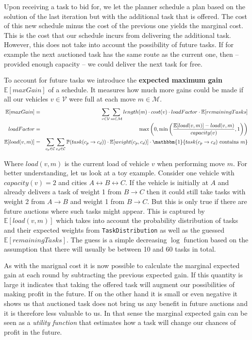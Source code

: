 \documentclass[11pt]{article}
\begin{document}
  Upon receiving a task to bid for, we let the planner schedule a plan based on
  the solution of the last iteration but with the additional task that is offered.
  The cost of this new schedule minus the cost of the previous one yields the
  marginal cost. This is the cost that our schedule incurs from delivering the
  additional task. However, this does not take into account the possibility of
  future tasks. If for example the next auctioned task has the same route as
  the current one, then -- provided enough capacity -- we could deliver the next
  task for free.

  To account for future tasks we introduce the \textbf{expected maximum gain}
  $\mathbb{E}[maxGain]$ of a schedule. It measures how much more gains could be
  made if all our vehicles $v \in \mathcal{V}$ were full at each move $m \in
  \mathcal{M}$.
  \begin{eqnarray*}
    \mathbb{E}[maxGain] &=&
    \sum_{v \in \mathcal{V}}
    \sum_{m \in \mathcal{M}}
    length(m) \cdot cost(v) \cdot
    loadFactor\cdot
    \mathbb{E}[remainingTasks]
    \\
    loadFactor &=& \max\left(0, \min\left(
    \frac{\mathbb{E}[load(v, m)] - load(v, m)}{capacity(v)},
    1 \right)\right)
    \\
    \mathbb{E}[load(v, m)] &=&
    \sum_{c_p \in \mathcal{C}} \sum_{c_d \in \mathcal{C}}
    \mathbb{P}(task(c_p \rightarrow c_d))
    \cdot \mathbb{E}[weight(c_p, c_d)] \cdot
    \mathbbm{1}\{task(c_p \rightarrow c_d) \text{ contains } m\}
  \end{eqnarray*}

  Where $load(v, m)$ is the current load of vehicle $v$ when performing move $m$.
  For better understanding, let us look at a toy example. Consider one vehicle
  with $capacity(v) = 2$ and cities $A \leftrightarrow B \leftrightarrow C$. If
  the vehicle is initially at $A$ and already delivers a task of weight 1 from $B
  \rightarrow C$ then it could still take tasks with weight 2 from $A \rightarrow
  B$ and weight 1 from $B \rightarrow C$. But this is only true if there are
  future auctions where such tasks might appear. This is captured by
  $\mathbb{E}[load(v, m)]$ which takes into account the probability distribution
  of tasks and their expected weights from \texttt{TaskDistribution} as well as
  the guessed $\mathbb{E}[remainingTasks]$. The guess is a simple decreasing
  $\log$ function based on the assumption that there will usually be between 10
  and 60 tasks in total.

  As with the marignal cost it is now possible to calculate the marginal expected
  gain at each round by subtracting the previous expected gain. If this quantity
  is large it indicates that taking the offered task will augment our
  possibilities of making profit in the future. If on the other hand it is small
  or even negative it shows us that auctioned task does not bring us any benefit
  in future auctions and it is therefore less valuable to us. In that sense the
  marginal expected gain can be seen as a \textit{utility function} that estimates
  how a task will change our chances of profit in the future.
\end{document}
